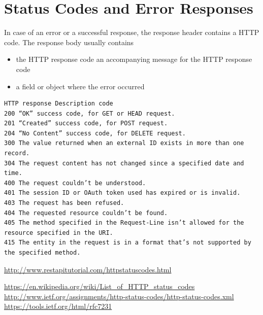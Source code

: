 \documentclass[10pt]{article}
\begin{document}
\section{Status Codes and Error Responses}

In case of an error or a successful response, the response header contains a HTTP code. The response
body usually contains 

\begin{itemize}
\item the HTTP response code
\ite an accompanying message for the HTTP response code
\item a field or object where the error occurred 
\end{itemize}

\begin{verbatim}
HTTP response Description code
200 “OK” success code, for GET or HEAD request.
201 “Created” success code, for POST request.
204 “No Content” success code, for DELETE request.
300 The value returned when an external ID exists in more than one record.
304 The request content has not changed since a specified date and time.
400 The request couldn’t be understood.
401 The session ID or OAuth token used has expired or is invalid. 
403 The request has been refused. 
404 The requested resource couldn’t be found. 
405 The method specified in the Request-Line isn’t allowed for the resource specified in the URI.
415 The entity in the request is in a format that’s not supported by the specified method.
\end{verbatim}

\url{http://www.restapitutorial.com/httpstatuscodes.html}

\url{https://en.wikipedia.org/wiki/List_of_HTTP_status_codes}
\url{http://www.ietf.org/assignments/http-status-codes/http-status-codes.xml}
\url{https://tools.ietf.org/html/rfc7231}
\end{document}
